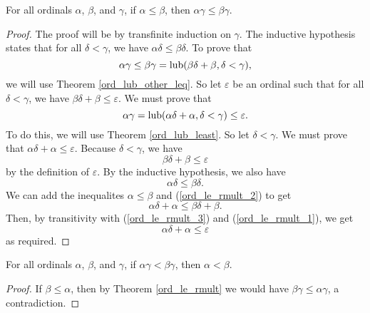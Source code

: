 \documentclass[../../math.tex]{subfiles}
\begin{document}
\begin{theorem} \label{ord_le_rmult}
    For all ordinals $\alpha$, $\beta$, and $\gamma$, if $\alpha \leq \beta$,
    then $\alpha\gamma \leq \beta\gamma$.
\end{theorem}
\begin{proof}
    The proof will be by transfinite induction on $\gamma$.  The inductive
    hypothesis states that for all $\delta < \gamma$, we have $\alpha \delta
    \leq \beta \delta$.  To prove that
    \[
        \alpha \gamma \leq \beta\gamma
        = \operatorname{lub}(\beta\delta + \beta, \delta < \gamma),
    \]
    we will use Theorem \ref{ord_lub_other_leq}.  So let $\varepsilon$ be an
    ordinal such that for all $\delta < \gamma$, we have $\beta \delta + \beta
    \leq \varepsilon$.  We must prove that
    \[
        \alpha\gamma = \operatorname{lub}(\alpha \delta + \alpha, \delta < \gamma)
        \leq \varepsilon.
    \]
    To do this, we will use Theorem \ref{ord_lub_least}.  So let $\delta <
    \gamma$.  We must prove that $\alpha\delta + \alpha \leq \varepsilon$.
    Because $\delta < \gamma$, we have
    \begin{equation} \label{ord_le_rmult_1}
        \beta\delta + \beta \leq \varepsilon
    \end{equation}
    by the definition of $\varepsilon$.  By the inductive hypothesis, we also
    have
    \begin{equation} \label{ord_le_rmult_2}
        \alpha\delta \leq \beta\delta.
    \end{equation}
    We can add the inequalites $\alpha \leq \beta$ and (\ref{ord_le_rmult_2}) to
    get
    \begin{equation} \label{ord_le_rmult_3}
        \alpha\delta + \alpha \leq \beta\delta + \beta.
    \end{equation}
    Then, by transitivity with (\ref{ord_le_rmult_3}) and
    (\ref{ord_le_rmult_1}), we get
    \[
        \alpha\delta + \alpha \leq \varepsilon
    \]
    as required.
\end{proof}

\begin{theorem} \label{ord_lt_mult_rcancel}
    For all ordinals $\alpha$, $\beta$, and $\gamma$, if $\alpha \gamma < \beta
    \gamma$, then $\alpha < \beta$.
\end{theorem}
\begin{proof}
    If $\beta \leq \alpha$, then by Theorem \ref{ord_le_rmult} we would have
    $\beta \gamma \leq \alpha \gamma$, a contradiction.
\end{proof}
\end{document}
